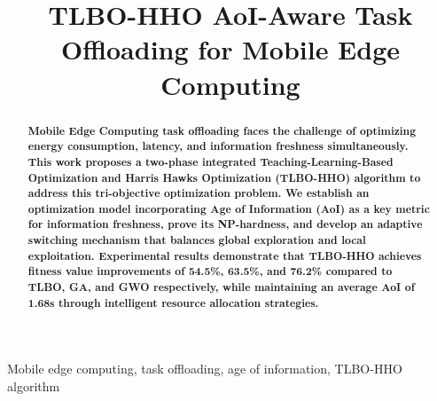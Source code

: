 \documentclass[conference]{IEEEtran}
\begin{document}
\title{TLBO-HHO AoI-Aware Task Offloading for Mobile Edge Computing}

\author{
\and
{}
\and
{}
}

\maketitle

\begin{abstract}

\textbf{Mobile Edge Computing task offloading faces the challenge of optimizing energy consumption, latency, and information freshness simultaneously. This work proposes a two-phase integrated Teaching-Learning-Based Optimization and Harris Hawks Optimization (TLBO-HHO) algorithm to address this tri-objective optimization problem. We establish an optimization model incorporating Age of Information (AoI) as a key metric for information freshness, prove its NP-hardness, and develop an adaptive switching mechanism that balances global exploration and local exploitation. Experimental results demonstrate that TLBO-HHO achieves fitness value improvements of 54.5\%, 63.5\%, and 76.2\% compared to TLBO, GA, and GWO respectively, while maintaining an average AoI of 1.68s through intelligent resource allocation strategies.}
\end{abstract}

\begin{IEEEkeywords}
Mobile edge computing, task offloading, age of information, TLBO-HHO algorithm
\end{IEEEkeywords}
\end{document}
